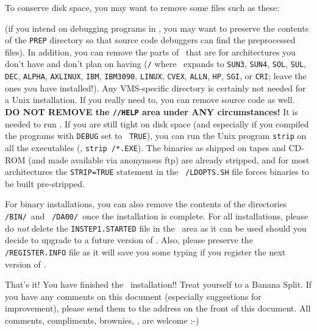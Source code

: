 \bigskip

\vfill\eject%

To conserve disk space, you may want to remove some files such as
these:\medskip

\medskip

\noindent (if you intend on debugging programs in \AIPS, you may want to
preserve the contents of the {\tt PREP} directory so that source code
debuggers can find the preprocessed files).  In addition, you can remove
the parts of \AIPS\ that are for architectures you don't have and don't
plan on having ({\tt \AVERS/\ARCH} where \ARCH\ expands to {\tt SUN3},
{\tt SUN4}, {\tt SOL}, {\tt SUL}, {\tt DEC}, {\tt ALPHA}, {\tt AXLINUX},
{\tt IBM}, {\tt IBM3090}, {\tt LINUX}, {\tt CVEX}, {\tt ALLN}, {\tt HP},
{\tt SGI}, or {\tt CRI}; leave the ones you have installed!).  Any
VMS-specific directory is certainly not needed for a Unix installation.
If you really need to, you can remove source code as well.  {\bf DO NOT
REMOVE the {\tt\AROOT/\THISVER/HELP} area under ANY circumstances!}  It
is needed to run \ttaips.  If you are still tight on disk space (and
especially if you compiled the programs with {\tt DEBUG} set to {\tt
TRUE}), you can run the Unix program {\tt strip} on all the executables
(\eg, {\tt strip \LOAD/*.EXE}).  The binaries as shipped on tapes and
CD-ROM (and made available via anonymous ftp) are already stripped, and
for most architectures the {\tt STRIP=TRUE} statement in the {\tt
\SYSL /LDOPTS.SH} file forces binaries to be built pre-stripped.

For binary installations, you can also remove the contents of the
directories {\tt \AROOT/\-BIN/\ARCH}\ and {\tt
\AROOT/\-DA00/\-\ARCH}\ once the installation is complete.  For all
installations, please do {\it not\/} delete the {\tt INSTEP1.STARTED}
file in the \AROOT\ area as it can be used should you decide to upgrade
to a future version of \AIPS.  Also, please preserve the {\tt
\AROOT/REGISTER.INFO} file as it will save you some typing if you
register the next version of \AIPS.

\noindent That's it!  You have finished the \aips\ installation!!
Treat yourself to a Banana Split.  If you have any comments on this
document (especially suggestions for improvement), please send them to
the address on the front of this document.  All comments, compliments,
brownies, \etc, are welcome :-)

